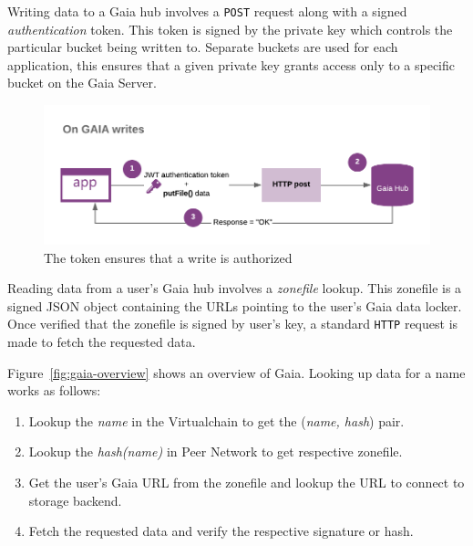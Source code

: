 		Writing data to a Gaia hub involves a \texttt{POST} request along with a signed \textit{authentication} token. This token is signed by the private key which controls the particular bucket being written to. Separate buckets are used for each application, this ensures that a given private key grants access only to a specific bucket on the Gaia Server.
		
		\begin{figure}[h]
			\includegraphics[width=\linewidth]{figures/gaia-writes}
			\caption{\label{fig:gaia-writes} The token ensures that a write is authorized\protect\footnotemark}
		\end{figure}
		
		Reading data from a user's Gaia hub involves a \textit{zonefile} lookup. This zonefile is a signed JSON object containing the URLs pointing to the user's Gaia data locker. Once verified that the zonefile is signed by user's key, a standard \texttt{HTTP} request is made to fetch the requested data.
		
		Figure~\ref{fig:gaia-overview} shows an overview of Gaia. Looking up data for a name works as follows:
		
		\begin{enumerate}
			\item Lookup the \textit{name} in the Virtualchain to get the (\textit{name, hash}) pair.
			\item Lookup the \textit{hash(name)} in Peer Network to get respective zonefile.
			\item Get the user's Gaia URL from the zonefile and lookup the URL to connect to storage backend.
			\item Fetch the requested data and verify the respective signature or hash.
		\end{enumerate}
		
